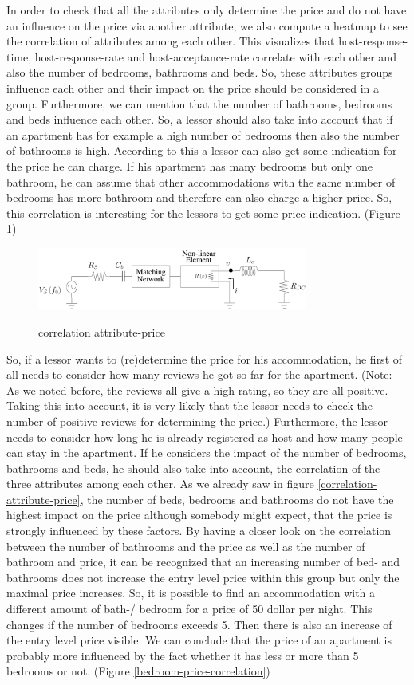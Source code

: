 In order to check that all the attributes only determine the price and do not have an influence on the price via another attribute, we also compute a heatmap to see the correlation of attributes among each other. This visualizes that host-response-time, host-response-rate and host-acceptance-rate correlate with each other and also the number of bedrooms, bathrooms and beds. So, these attributes groups influence each other and their impact on the price should be considered in a group. Furthermore, we can mention that the number of bathrooms, bedrooms and beds influence each other. So, a lessor should also take into account that if an apartment has for example a high number of bedrooms then also the number of bathrooms is high. According to this a lessor can also get some indication for the price he can charge. If his apartment has many bedrooms but only one bathroom, he can assume that other accommodations with the same number of bedrooms has more bathroom and therefore can also charge a higher price. So, this correlation is interesting for the lessors to get some price indication. (Figure \ref{heatmap })
\begin{figure}
  \begin{center}
  \includegraphics[width=3.5in]{pdf/01.pdf}\\
  \caption{correlation attribute-price}\label{heatmap }
  \end{center}
\end{figure}
So, if a lessor wants to (re)determine the price for his accommodation, he first of all needs to consider how many reviews he got so far for the apartment. (Note: As we noted before, the reviews all give a high rating, so they are all positive. Taking this into account, it is very likely that the lessor needs to check the number of positive reviews for determining the price.) Furthermore, the lessor needs to consider how long he is already registered as host and how many people can stay in the apartment. If he considers the impact of the number of bedrooms, bathrooms and beds, he should also take into account, the correlation of the three attributes among each other.
As we already saw in figure \ref{correlation-attribute-price}, the number of beds, bedrooms and bathrooms do not have the highest impact on the price although somebody might expect, that the price is strongly influenced by these factors. By having a closer look on the correlation between the number of bathrooms and the price as well as the number of bathroom and price, it can be recognized that an increasing number of bed- and bathrooms does not increase the entry level price within this group but only the maximal price increases. So, it is possible to find an accommodation with a different amount of bath-/ bedroom for a price of 50 dollar per night. This changes if the number of bedrooms exceeds 5. Then there is also an increase of the entry level price visible. We can conclude that the price of an apartment is probably more influenced by the fact whether it has less or more than 5 bedrooms or not. (Figure \ref{bedroom-price-correlation})
